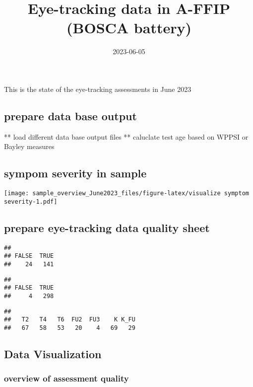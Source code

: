 \documentclass[
]{article}
\title{Eye-tracking data in A-FFIP (BOSCA battery)}
\author{}
\date{\vspace{-2.5em}2023-06-05}
\begin{document}
\maketitle

This is the state of the eye-tracking assessments in June 2023

\hypertarget{prepare-data-base-output}{%
\subsection{prepare data base output}\label{prepare-data-base-output}}

** load different data base output files ** caluclate test age based on
WPPSI or Bayley measures

\hypertarget{sympom-severity-in-sample}{%
\subsection{sympom severity in sample}\label{sympom-severity-in-sample}}

\texttt{[image: sample\_overview\_June2023\_files/figure-latex/visualize symptom severity-1.pdf]}

\hypertarget{prepare-eye-tracking-data-quality-sheet}{%
\subsection{prepare eye-tracking data quality
sheet}\label{prepare-eye-tracking-data-quality-sheet}}

\begin{verbatim}
## 
## FALSE  TRUE 
##    24   141
\end{verbatim}

\begin{verbatim}
## 
## FALSE  TRUE 
##     4   298
\end{verbatim}

\begin{verbatim}
## 
##   T2   T4   T6  FU2  FU3    K K_FU 
##   67   58   53   20    4   69   29
\end{verbatim}

\hypertarget{data-visualization}{%
\subsection{Data Visualization}\label{data-visualization}}

\hypertarget{overview-of-assessment-quality}{%
\subsubsection{overview of assessment
quality}\label{overview-of-assessment-quality}}
\end{document}
